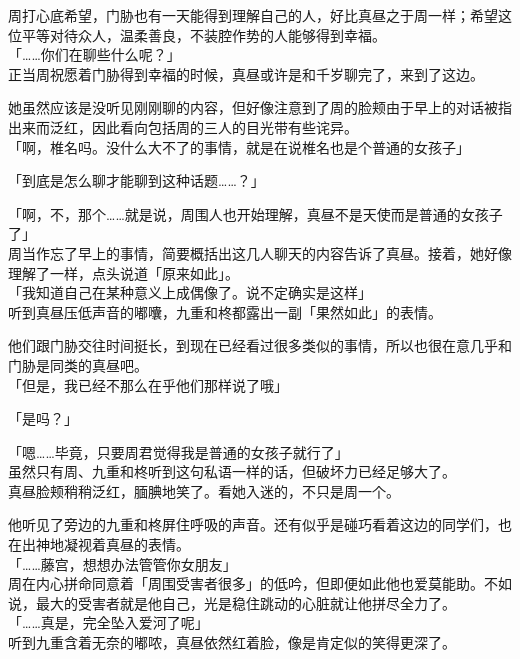 周打心底希望，门胁也有一天能得到理解自己的人，好比真昼之于周一样；希望这位平等对待众人，温柔善良，不装腔作势的人能够得到幸福。\\

「……你们在聊些什么呢？」\\

正当周祝愿着门胁得到幸福的时候，真昼或许是和千岁聊完了，来到了这边。

她虽然应该是没听见刚刚聊的内容，但好像注意到了周的脸颊由于早上的对话被指出来而泛红，因此看向包括周的三人的目光带有些诧异。\\

「啊，椎名吗。没什么大不了的事情，就是在说椎名也是个普通的女孩子」

「到底是怎么聊才能聊到这种话题……？」

「啊，不，那个……就是说，周围人也开始理解，真昼不是天使而是普通的女孩子了」\\

周当作忘了早上的事情，简要概括出这几人聊天的内容告诉了真昼。接着，她好像理解了一样，点头说道「原来如此」。\\

「我知道自己在某种意义上成偶像了。说不定确实是这样」\\

听到真昼压低声音的嘟囔，九重和柊都露出一副「果然如此」的表情。

他们跟门胁交往时间挺长，到现在已经看过很多类似的事情，所以也很在意几乎和门胁是同类的真昼吧。\\

「但是，我已经不那么在乎他们那样说了哦」

「是吗？」

「嗯……毕竟，只要周君觉得我是普通的女孩子就行了」\\

虽然只有周、九重和柊听到这句私语一样的话，但破坏力已经足够大了。\\

真昼脸颊稍稍泛红，腼腆地笑了。看她入迷的，不只是周一个。

他听见了旁边的九重和柊屏住呼吸的声音。还有似乎是碰巧看着这边的同学们，也在出神地凝视着真昼的表情。\\

「……藤宫，想想办法管管你女朋友」\\

周在内心拼命同意着「周围受害者很多」的低吟，但即便如此他也爱莫能助。不如说，最大的受害者就是他自己，光是稳住跳动的心脏就让他拼尽全力了。\\

「……真是，完全坠入爱河了呢」\\

听到九重含着无奈的嘟哝，真昼依然红着脸，像是肯定似的笑得更深了。
